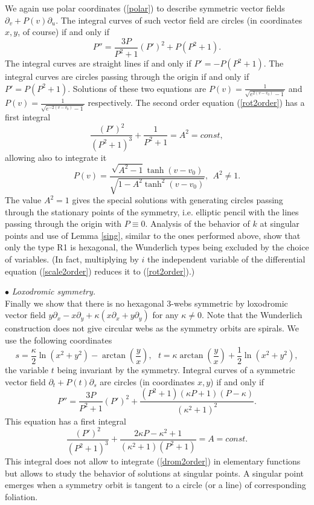\documentclass[11pt,a4paper]{article}
\begin{document}
We again use polar coordinates (\ref{polar}) to describe symmetric vector fields $\partial_v+P(v)\partial_u$.
The integral curves of such vector field  are circles (in coordinates $x,y$, of course)
if and only if 
\begin{equation}\label{rot2order}
P''=\frac{3P}{P^2 + 1}(P')^2 + P(P^2 + 1). 
\end{equation}
The integral curves are straight lines if and only if 
$P'=-P(P^2+1)$. The  integral curves are circles passing through the origin if and only if $P'=P(P^2+1)$. Solutions of these two equations are  $P(v)=\frac{1}{\sqrt{e^{2(v-v_0)}-1}}$ and  $P(v)=\frac{1}{\sqrt{e^{-2(v-v_0)}-1}}$ respectively.  
The second order equation (\ref{rot2order}) has a first integral
$$
\frac{(P')^2}{(P^2 + 1)^3} + \frac{1}{P^2 + 1} =A^2=const, 
$$
allowing also to integrate it 
\begin{equation}\label{generalrot}
P(v)=\frac{\sqrt{A^2 - 1}\tanh(v - v_0)}{\sqrt{1 - A^2\tanh^2(v - v_0)}}, \ \ A^2\ne 1. 
\end{equation}
The value $A^2=1$ gives the special solutions with generating circles passing through the stationary points of the symmetry, i.e.  elliptic pencil with the lines passing through the origin with $P\equiv 0$. 
Analysis of the behavior of $k$ at singular points and use of Lemma \ref{sing}, similar to the ones performed above, show that  only the type R1 is hexagonal, the Wunderlich types being excluded by the choice of variables. (In fact, multiplying by $i$ the independent variable of the differential equation (\ref{scale2order}) reduces it to (\ref{rot2order}).)   

$\bullet${ \it Loxodromic symmetry. }\\  
Finally we show that there is no hexagonal 3-webs symmetric by loxodromic vector field $y\partial_x-x\partial_y+\kappa (x\partial_x+y\partial_y)$ for any $\kappa\ne 0$. Note that the Wunderlich construction does not give circular webs as the symmetry orbits  are spirals. We use the following coordinates 
$$
s= \frac{\kappa}{2} \ln(x^2 + y^2)-\arctan\left(\frac{y}{x}\right), \ \ \ t=\kappa\arctan\left(\frac{y}{x}\right)+ \frac{1}{2} \ln(x^2 + y^2),
$$ 
the variable $t$ being invariant by the symmetry. 
Integral curves of a symmetric vector field $\partial_t+P(t)\partial_s$ are circles (in coordinates $x,y$) 
if and only if 
\begin{equation}\label{drom2order}
P''=\frac{3P}{P^2 + 1}(P')^2 + \frac{(P^2 + 1)(\kappa P + 1)(P-\kappa)}{(\kappa^2 + 1)^2}. 
\end{equation}
This  equation has a first integral
$$
\frac{(P')^2}{(P^2 + 1)^3} + \frac{2\kappa P -\kappa^2+1}{(\kappa ^2+1)(P^2 + 1)} =A=const. 
$$
This integral does not allow to integrate (\ref{drom2order}) in elementary functions but allows to study the behavior of solutions at singular points. A singular point emerges when a symmetry orbit is tangent to a circle (or a line) of corresponding foliation. 
\end{document}
